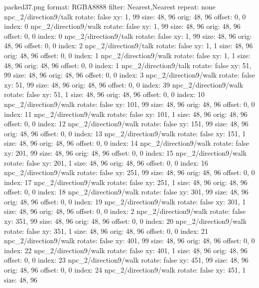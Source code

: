 packed37.png
format: RGBA8888
filter: Nearest,Nearest
repeat: none
npc_2/direction9/talk
  rotate: false
  xy: 1, 99
  size: 48, 96
  orig: 48, 96
  offset: 0, 0
  index: 0
npc_2/direction9/walk
  rotate: false
  xy: 1, 99
  size: 48, 96
  orig: 48, 96
  offset: 0, 0
  index: 0
npc_2/direction9/talk
  rotate: false
  xy: 1, 99
  size: 48, 96
  orig: 48, 96
  offset: 0, 0
  index: 2
npc_2/direction9/talk
  rotate: false
  xy: 1, 1
  size: 48, 96
  orig: 48, 96
  offset: 0, 0
  index: 1
npc_2/direction9/walk
  rotate: false
  xy: 1, 1
  size: 48, 96
  orig: 48, 96
  offset: 0, 0
  index: 1
npc_2/direction9/talk
  rotate: false
  xy: 51, 99
  size: 48, 96
  orig: 48, 96
  offset: 0, 0
  index: 3
npc_2/direction9/walk
  rotate: false
  xy: 51, 99
  size: 48, 96
  orig: 48, 96
  offset: 0, 0
  index: 39
npc_2/direction9/walk
  rotate: false
  xy: 51, 1
  size: 48, 96
  orig: 48, 96
  offset: 0, 0
  index: 10
npc_2/direction9/walk
  rotate: false
  xy: 101, 99
  size: 48, 96
  orig: 48, 96
  offset: 0, 0
  index: 11
npc_2/direction9/walk
  rotate: false
  xy: 101, 1
  size: 48, 96
  orig: 48, 96
  offset: 0, 0
  index: 12
npc_2/direction9/walk
  rotate: false
  xy: 151, 99
  size: 48, 96
  orig: 48, 96
  offset: 0, 0
  index: 13
npc_2/direction9/walk
  rotate: false
  xy: 151, 1
  size: 48, 96
  orig: 48, 96
  offset: 0, 0
  index: 14
npc_2/direction9/walk
  rotate: false
  xy: 201, 99
  size: 48, 96
  orig: 48, 96
  offset: 0, 0
  index: 15
npc_2/direction9/walk
  rotate: false
  xy: 201, 1
  size: 48, 96
  orig: 48, 96
  offset: 0, 0
  index: 16
npc_2/direction9/walk
  rotate: false
  xy: 251, 99
  size: 48, 96
  orig: 48, 96
  offset: 0, 0
  index: 17
npc_2/direction9/walk
  rotate: false
  xy: 251, 1
  size: 48, 96
  orig: 48, 96
  offset: 0, 0
  index: 18
npc_2/direction9/walk
  rotate: false
  xy: 301, 99
  size: 48, 96
  orig: 48, 96
  offset: 0, 0
  index: 19
npc_2/direction9/walk
  rotate: false
  xy: 301, 1
  size: 48, 96
  orig: 48, 96
  offset: 0, 0
  index: 2
npc_2/direction9/walk
  rotate: false
  xy: 351, 99
  size: 48, 96
  orig: 48, 96
  offset: 0, 0
  index: 20
npc_2/direction9/walk
  rotate: false
  xy: 351, 1
  size: 48, 96
  orig: 48, 96
  offset: 0, 0
  index: 21
npc_2/direction9/walk
  rotate: false
  xy: 401, 99
  size: 48, 96
  orig: 48, 96
  offset: 0, 0
  index: 22
npc_2/direction9/walk
  rotate: false
  xy: 401, 1
  size: 48, 96
  orig: 48, 96
  offset: 0, 0
  index: 23
npc_2/direction9/walk
  rotate: false
  xy: 451, 99
  size: 48, 96
  orig: 48, 96
  offset: 0, 0
  index: 24
npc_2/direction9/walk
  rotate: false
  xy: 451, 1
  size: 48, 96
